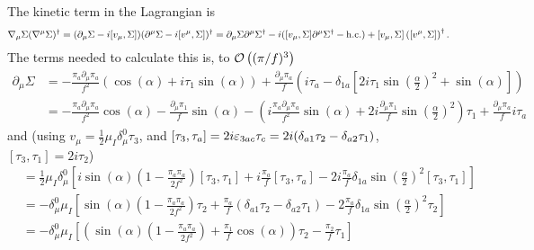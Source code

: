 \documentclass{article}
\begin{document}
The kinetic term in the Lagrangian is
\begin{align*}
    \nabla_\mu \Sigma (\nabla^\mu \Sigma)^\dagger 
    & = (\partial_\mu \Sigma - i[v_\mu, \Sigma]) 
    (\partial^\mu \Sigma- i[v^\mu, \Sigma])^\dagger
    = \partial_\mu \Sigma \partial^\mu \Sigma^\dagger - i([v_\mu, \Sigma] \partial^\mu \Sigma^\dagger - \hc) + [v_\mu, \Sigma]\left([v^\mu, \Sigma]\right)^\dagger.
\end{align*}
The terms needed to calculate this is, to $\Oh[3]{(\pi /f)}$
\begin{align*}
    \partial_\mu \Sigma
    & = - \frac{\pi_a\partial_\mu \pi_a}{f^2} (\cos(\alpha) + i \tau_1 \sin(\alpha))
    + \frac{\partial_\mu \pi_a}{f}
    \left(
        i\tau_a - \delta_{1a} 
        \left[
        2  i \tau_1 \sin(\frac{\alpha}{2})^2 + \sin(\alpha)
        \right]
    \right) \\
    & = 
    - \frac{\pi_a\partial_\mu \pi_a}{f^2} \cos(\alpha) 
    - \frac{\partial_\mu \pi_1}{f} \sin(\alpha)
    -\left(
        i\frac{\pi_a\partial_\mu \pi_a}{f^2}\sin(\alpha)
        + 2 i \frac{\partial_\mu \pi_1}{f}\sin(\frac{\alpha}{2})^2
    \right) \tau_1 
    + \frac{\partial_\mu \pi_a}{f}  i\tau_a
\end{align*}
and (using $v_\mu = \frac{1}{2} \mu_I \delta^0_\mu \tau_3$, and $[\tau_3, \tau_a] = 2 i \eps_{3ac} \tau_c = 2i (\delta_{a1}\tau_2-\delta_{a2}\tau_1)$, $[\tau_3, \tau_1] = 2 i \tau_2$)
\begin{align*}
    [v_\mu, \Sigma] 
    & = \frac{1}{2} \mu_I \delta_\mu^0 
    \left[
        i \sin(\alpha)\left(1 - \frac{\pi_a \pi_a}{2f^2}\right)[\tau_3, \tau_1]
        +i \frac{\pi_a}{f}[\tau_3, \tau_a] 
        - 2 i \frac{\pi_a}{f}\delta_{1 a} \sin(\frac{\alpha}{2})^2[\tau_3, \tau_1]
    \right] \\
    & = - \delta_\mu^0 \mu_I
    \left[
        \sin(\alpha)\left(1 - \frac{\pi_a \pi_a}{2f^2}\right) \tau_2
        + \frac{\pi_a}{f} (\delta_{a1}\tau_2-\delta_{a2}\tau_1)
        - 2 \frac{\pi_a}{f}\delta_{1 a} \sin(\frac{\alpha}{2})^2 \tau_2
    \right] \\
    & = - \delta_\mu^0 \mu_I
    \left[
        \left(
            \sin(\alpha)\left(1 - \frac{\pi_a \pi_a}{2f^2}\right)
            + \frac{\pi_1}{f} \cos(\alpha)
        \right)\tau_2
        -\frac{\pi_2}{f}\tau_1
    \right]
\end{align*}
\end{document}

